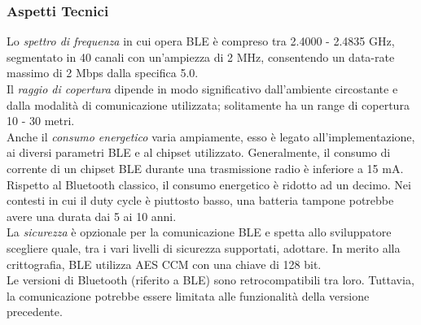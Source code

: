 \subsubsection{Aspetti Tecnici}
Lo \textit{spettro di frequenza} in cui opera BLE \cite{bluetooth2016specification} è compreso tra 2.4000 - 2.4835 GHz, segmentato in 40 canali con un'ampiezza di 2 MHz, consentendo un data-rate massimo di 2 Mbps dalla specifica 5.0. \\
Il \textit{raggio di copertura} dipende in modo significativo dall'ambiente circostante e dalla modalità di comunicazione utilizzata; solitamente ha un range di copertura 10 - 30 metri. \\
Anche il \textit{consumo energetico} varia ampiamente, esso è legato all'implementazione, ai diversi parametri BLE e al chipset utilizzato. Generalmente, il consumo di corrente di un chipset BLE durante una trasmissione radio è inferiore a 15 mA. Rispetto al Bluetooth classico, il consumo energetico è ridotto ad un decimo. Nei contesti in cui il duty cycle è piuttosto basso, una batteria tampone potrebbe avere una durata dai 5 ai 10 anni.\\
La \textit{sicurezza} è opzionale per la comunicazione BLE e spetta allo sviluppatore scegliere quale, tra i vari livelli di sicurezza supportati, adottare. In merito alla crittografia, BLE utilizza AES CCM con una chiave di 128 bit.\\
Le versioni di Bluetooth (riferito a BLE) sono retrocompatibili tra loro. Tuttavia, la comunicazione potrebbe essere limitata alle funzionalità della versione precedente.

